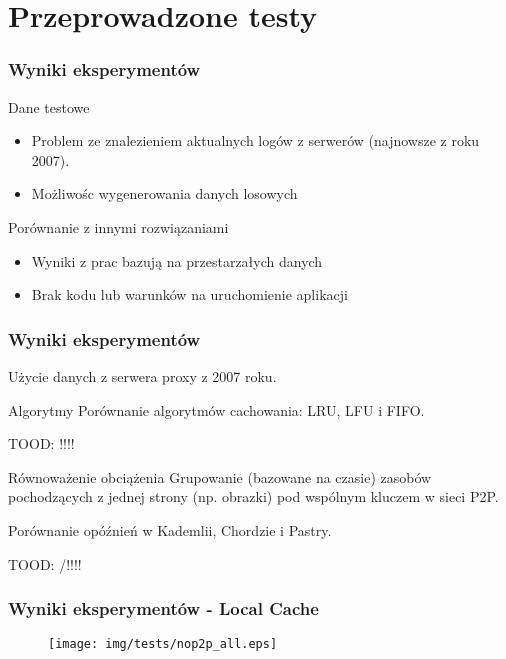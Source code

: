 \documentclass{beamer}
\begin{document}
\section{Przeprowadzone testy}
\begin{frame}
\frametitle{Wyniki eksperymentów}

\begin{block}{Dane testowe}
\begin{itemize}
  \item Problem ze znalezieniem aktualnych logów z serwerów (najnowsze z roku 2007).
  \item Możliwośc wygenerowania danych losowych 
\end{itemize}
\end{block}

\begin{block}{Porównanie z innymi rozwiązaniami}
\begin{itemize}
  \item Wyniki z prac bazują na przestarzałych danych
  \item Brak kodu lub warunków na uruchomienie aplikacji
\end{itemize}
\end{block}
\end{frame}

\begin{frame}
\frametitle{Wyniki eksperymentów}
\begin{block}{}
Użycie danych z serwera proxy z 2007 roku.
\end{block}

\begin{block}{Algorytmy}
Porównanie algorytmów cachowania: LRU, LFU i FIFO.
\end{block}
TOOD: !!!!
\begin{block}{Równoważenie obciążenia}
Grupowanie (bazowane na czasie) zasobów pochodzących z jednej strony (np. obrazki) pod wspólnym kluczem w sieci P2P.
\end{block}

\begin{block}{}
Porównanie opóźnień w Kademlii, Chordzie i Pastry.
\end{block}
TOOD: /!!!!

\end{frame}

\begin{frame}
\frametitle{Wyniki eksperymentów - Local Cache}
\begin{figure}
\centering
\texttt{[image: img/tests/nop2p\_all.eps]}
\end{figure}
\end{frame}
\end{document}
